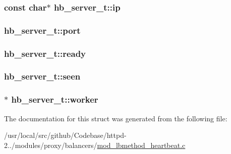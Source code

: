 \subsubsection[{\texorpdfstring{ip}{ip}}]{\setlength{\rightskip}{0pt plus 5cm}const char$\ast$ hb\+\_\+server\+\_\+t\+::ip}\hypertarget{structhb__server__t_a5eb11e24e399c53661524f7e940ac5f4}{}\label{structhb__server__t_a5eb11e24e399c53661524f7e940ac5f4}
\subsubsection[{\texorpdfstring{port}{port}}]{ hb\+\_\+server\+\_\+t\+::port}\hypertarget{structhb__server__t_ae402b79fe13433c7f6edb70840ff3863}{}\label{structhb__server__t_ae402b79fe13433c7f6edb70840ff3863}
\subsubsection[{\texorpdfstring{ready}{ready}}]{ hb\+\_\+server\+\_\+t\+::ready}\hypertarget{structhb__server__t_a873314deec3d0e76e10574cf15ce0f91}{}\label{structhb__server__t_a873314deec3d0e76e10574cf15ce0f91}
\subsubsection[{\texorpdfstring{seen}{seen}}]{ hb\+\_\+server\+\_\+t\+::seen}\hypertarget{structhb__server__t_a079ec644889d7c4016118adc843d172e}{}\label{structhb__server__t_a079ec644889d7c4016118adc843d172e}
\subsubsection[{\texorpdfstring{worker}{worker}}]{$\ast$ hb\+\_\+server\+\_\+t\+::worker}\hypertarget{structhb__server__t_a2a109b248077b68724230b1e84b1f802}{}\label{structhb__server__t_a2a109b248077b68724230b1e84b1f802}


The documentation for this struct was generated from the following file\+:\begin{DoxyCompactItemize}
\item 
/usr/local/src/github/\+Codebase/httpd-\/2../modules/proxy/balancers/\hyperlink{mod__lbmethod__heartbeat_8c}{mod\+\_\+lbmethod\+\_\+heartbeat.\+c}\end{DoxyCompactItemize}
